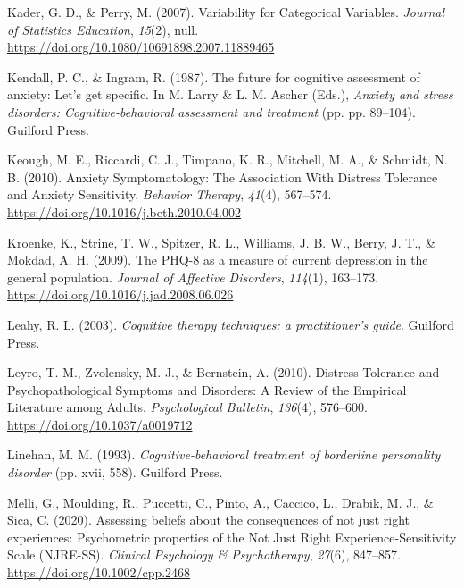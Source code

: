 \documentclass[
  man,floatsintext]{apa7}
\newlength{\cslhangindent}
\newlength{\cslentryspacingunit} %
\newenvironment{CSLReferences}[2] %
 {%
  \setlength{\parindent}{0pt}
  \ifodd #1
  \let\oldpar\par
  \def\par{\hangindent=\cslhangindent\oldpar}
  \fi
  \setlength{\parskip}{#2\cslentryspacingunit}
 }%
 {}
\begin{document}
\begin{CSLReferences}{1}{0}
\leavevmode{}%
Kader, G. D., \& Perry, M. (2007). Variability for Categorical Variables. \emph{Journal of Statistics Education}, \emph{15}(2), null. \url{https://doi.org/10.1080/10691898.2007.11889465}

\leavevmode{}%
Kendall, P. C., \& Ingram, R. (1987). The future for cognitive assessment of anxiety: Let's get specific. In M. Larry \& L. M. Ascher (Eds.), \emph{Anxiety and stress disorders: Cognitive-behavioral assessment and treatment} (pp. pp. 89--104). Guilford Press.

\leavevmode{}%
Keough, M. E., Riccardi, C. J., Timpano, K. R., Mitchell, M. A., \& Schmidt, N. B. (2010). Anxiety Symptomatology: The Association With Distress Tolerance and Anxiety Sensitivity. \emph{Behavior Therapy}, \emph{41}(4), 567--574. \url{https://doi.org/10.1016/j.beth.2010.04.002}

\leavevmode{}%
Kroenke, K., Strine, T. W., Spitzer, R. L., Williams, J. B. W., Berry, J. T., \& Mokdad, A. H. (2009). The PHQ-8 as a measure of current depression in the general population. \emph{Journal of Affective Disorders}, \emph{114}(1), 163--173. \url{https://doi.org/10.1016/j.jad.2008.06.026}

\leavevmode{}%
Leahy, R. L. (2003). \emph{Cognitive therapy techniques: a practitioner's guide}. Guilford Press.

\leavevmode{}%
Leyro, T. M., Zvolensky, M. J., \& Bernstein, A. (2010). Distress Tolerance and Psychopathological Symptoms and Disorders: A Review of the Empirical Literature among Adults. \emph{Psychological Bulletin}, \emph{136}(4), 576--600. \url{https://doi.org/10.1037/a0019712}

\leavevmode{}%
Linehan, M. M. (1993). \emph{Cognitive-behavioral treatment of borderline personality disorder} (pp. xvii, 558). Guilford Press.

\leavevmode{}%
Melli, G., Moulding, R., Puccetti, C., Pinto, A., Caccico, L., Drabik, M. J., \& Sica, C. (2020). Assessing beliefs about the consequences of not just right experiences: Psychometric properties of the Not Just Right Experience-Sensitivity Scale (NJRE-SS). \emph{Clinical Psychology \& Psychotherapy}, \emph{27}(6), 847--857. \url{https://doi.org/10.1002/cpp.2468}


\end{CSLReferences}
\end{document}
